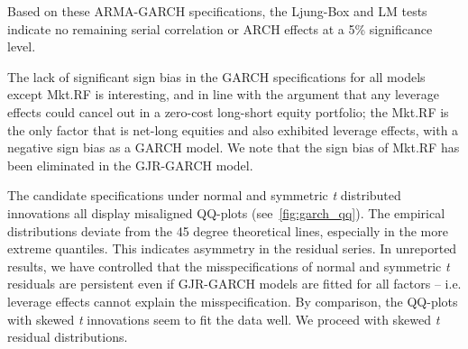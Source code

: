 

Based on these ARMA-GARCH specifications, the Ljung-Box and LM tests indicate no remaining serial correlation or ARCH effects at a 5\% significance level.

The lack of significant sign bias in the GARCH specifications for all models except Mkt.RF is interesting, and in line with the argument that any leverage effects could cancel out in a zero-cost long-short equity portfolio; the Mkt.RF is the only factor that is net-long equities and also exhibited leverage effects, with a negative sign bias as a GARCH model. We note that the sign bias of Mkt.RF has been eliminated in the GJR-GARCH model.

The candidate specifications under normal and symmetric \emph{t} distributed innovations all display misaligned QQ-plots (see~\autoref{fig:garch_qq}). The empirical distributions deviate from the 45 degree theoretical lines, especially in the more extreme quantiles. This indicates asymmetry in the residual series. In unreported results, we have controlled that the misspecifications of normal and symmetric \emph{t} residuals are persistent even if GJR-GARCH models are fitted for all factors -- i.e. leverage effects cannot explain the misspecification. By comparison, the QQ-plots with skewed \emph{t} innovations seem to fit the data well. We proceed with skewed \textit{t} residual distributions.

